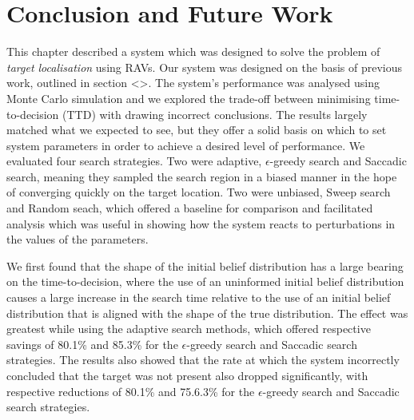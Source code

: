 \section{Conclusion and Future Work}


This chapter described a system which was designed to solve the problem of \textit{target localisation} using RAVs. Our system was designed on the basis of previous work, outlined in section <>. The system's performance was analysed using Monte Carlo simulation and we explored the trade-off between minimising time-to-decision (TTD) with drawing incorrect conclusions. The results largely matched what we expected to see, but they offer a solid basis on which to set system parameters in order to achieve a desired level of performance. We evaluated four search strategies. Two were adaptive, $\epsilon$-greedy search and Saccadic search, meaning they sampled the search region in a biased manner in the hope of converging quickly on the target location. Two were unbiased, Sweep search and Random seach, which offered a baseline for comparison and facilitated analysis which was useful in showing how the system reacts to perturbations in the values of the parameters.

We first found that the shape of the initial belief distribution has a large bearing on the time-to-decision, where the use of an uninformed initial belief distribution causes a large increase in the search time relative to the use of an initial belief distribution that is aligned with the shape of the true distribution. The effect was greatest while using the adaptive search methods, which offered respective savings of 80.1\% and 85.3\% for the $\epsilon$-greedy search and Saccadic search strategies. The results also showed that the rate at which the system incorrectly concluded that the target was not present also dropped significantly, with respective reductions of 80.1\% and 75.6.3\% for the $\epsilon$-greedy search and Saccadic search strategies. \par


